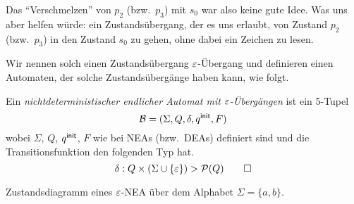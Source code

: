 {Das "`Verschmelzen"' von $p_2$ (bzw.\ $p_3$) mit $s_0$ war also keine gute Idee.
Was uns aber helfen würde: ein Zustandsübergang, der es uns erlaubt, von Zustand $p_2$ (bzw.\ $p_3$) in den Zustand $s_0$ zu gehen, ohne dabei ein Zeichen zu lesen.

Wir nennen solch einen Zustandsübergang $\varepsilon$-Übergang und definieren einen Automaten, der solche Zustandsübergänge haben kann, wie folgt.

\begin{Def}\label{def2.EpsNea}
        Ein \emph{nichtdeterministischer endlicher Automat mit $\varepsilon$-Übergängen} ist ein 5-Tupel
        \[ \mathcal{B}= (\Sigma, Q,\delta,q^\mathsf{init},F) \]
wobei $\Sigma$, $Q$, $q^\mathsf{init}$, $F$ wie bei \acs*{NEA}s (bzw.\ \acs*{DEA}s) definiert sind und die Transitionsfunktion den folgenden Typ hat.
\[
\delta:Q\times(\Sigma\cup\{\varepsilon\})\->\mathcal{P}(Q)
\qedhere
\]
\end{Def}

\begin{Bsp}\label{bsp2.EpsNeaEx} 
   Zustandsdiagramm eines $\varepsilon$-NEA über dem Alphabet $\Sigma=\{a,b\}$.
   \begin{center}
   \end{center}
\end{Bsp}

}
